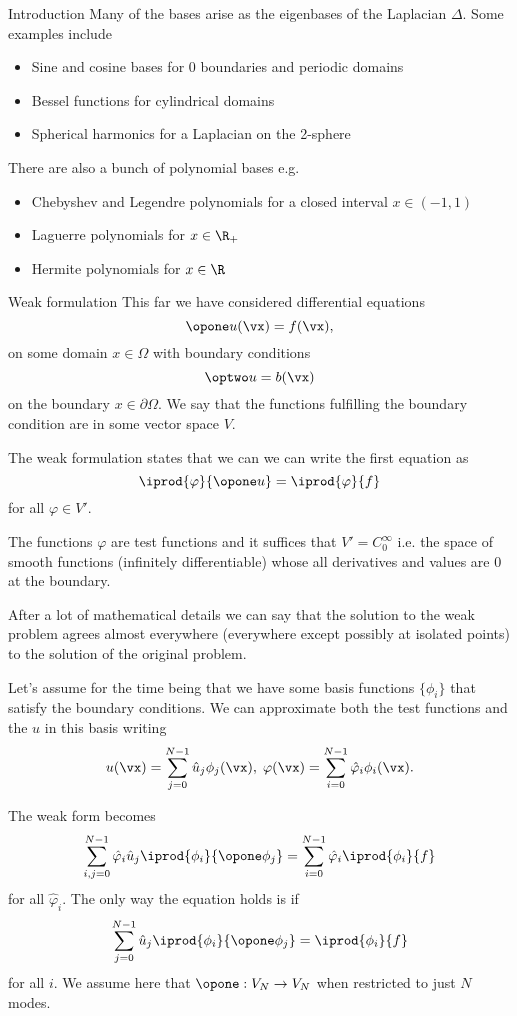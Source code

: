 \begin{frame}{Introduction}
	Many of the bases arise as the eigenbases of the Laplacian $ \Delta $. Some examples include
	\begin{itemize}[<+->]
		\item Sine and cosine bases for 0 boundaries and periodic domains
		\item Bessel functions for cylindrical domains
		\item Spherical harmonics for a Laplacian on the 2-sphere
	\end{itemize}

	There are also a bunch of polynomial bases e.g.
	\begin{itemize}[<+->]
		\item Chebyshev and Legendre polynomials for a closed interval $ x \in (-1,1) $
		\item Laguerre polynomials for $ x \in \R_+ $
		\item Hermite polynomials for $ x \in \R $
	\end{itemize}
\end{frame}

\begin{frame}{Weak formulation}
	This far we have considered differential equations
	\[ \opone u (\vx) = f(\vx), \]
	on some domain $ x \in \Omega $ with boundary conditions 
	\[ \optwo u  = b(\vx) \]
	on the boundary $ x \in \partial \Omega $. We say that the functions fulfilling the boundary condition are in some vector space $ V $. 
	
	\pause
	The weak formulation states that we can we can write the first equation as
	\[ \iprod{\varphi}{\opone u} = \iprod{\varphi}{f} \]
	for all $ \varphi \in V' $. 
	
	\pause
	The functions $ \varphi $ are \alert{test functions} and it suffices that $ V' = C_0^{\infty} $ i.e. the space of smooth functions (infinitely differentiable) whose all derivatives and values are 0 at the boundary.
\end{frame}

\begin{frame}
	After a lot of mathematical details we can say that the solution to the weak problem agrees almost everywhere (everywhere except possibly at isolated points) to the solution of the original problem. 
	
	\pause
	Let's assume for the time being that we have some basis functions $ \{ \phi_i \} $ that satisfy the boundary conditions. We can approximate both the test functions and the $ u $ in this basis writing 
	\[ u(\vx) = \sum_{j=0}^{N-1} \hat{u}_j \phi_j(\vx), \; \varphi(\vx) = \sum_{i=0}^{N-1} \hat{\varphi}_i \phi_i(\vx).  \]
	
	\pause
	The weak form becomes
	\[ \sum_{i,j =0}^{N-1} \hat{\varphi}_i \hat{u}_j \iprod{\phi_i}{\opone \phi_j} 
	= \sum_{i=0}^{N-1} \hat{\varphi}_i \iprod{\phi_i}{f}
	\]
	for all $ \hat{\varphi}_i $. The only way the equation holds is if
	\[ \sum_{j =0}^{N-1} \hat{u}_j \iprod{\phi_i}{\opone \phi_j} 
	=  \iprod{\phi_i}{f}
	\]
	for all $ i $. We assume here that $ \opone : V_N \to V_N  $ when restricted to just $ N $ modes.
\end{frame}

